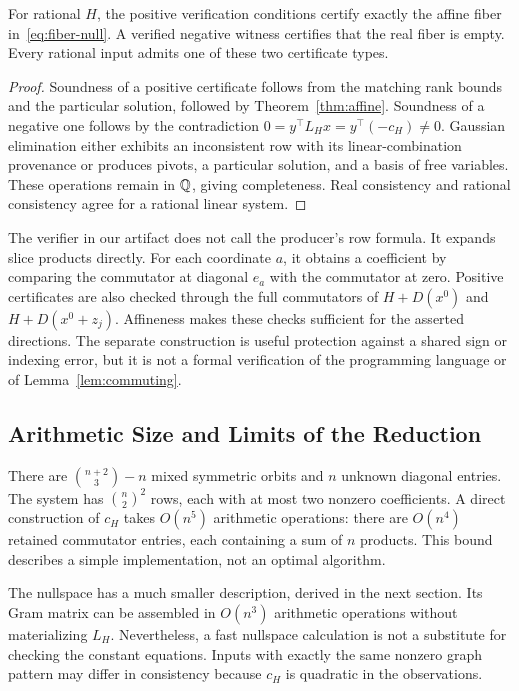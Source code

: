 \begin{proposition}\label{prop:certificates}
For rational $H$, the positive verification conditions certify exactly the affine fiber in~\eqref{eq:fiber-null}. A verified negative witness certifies that the real fiber is empty. Every rational input admits one of these two certificate types.
\end{proposition}
\begin{proof}
Soundness of a positive certificate follows from the matching rank bounds and the particular solution, followed by Theorem~\ref{thm:affine}. Soundness of a negative one follows by the contradiction $0=y^\top L_Hx=y^\top(-c_H)\ne0$. Gaussian elimination either exhibits an inconsistent row with its linear-combination provenance or produces pivots, a particular solution, and a basis of free variables. These operations remain in $\mathbb Q$, giving completeness. Real consistency and rational consistency agree for a rational linear system.
\end{proof}

The verifier in our artifact does not call the producer's row formula. It expands slice products directly. For each coordinate $a$, it obtains a coefficient by comparing the commutator at diagonal $e_a$ with the commutator at zero. Positive certificates are also checked through the full commutators of $H+D(x^0)$ and $H+D(x^0+z_j)$. Affineness makes these checks sufficient for the asserted directions. The separate construction is useful protection against a shared sign or indexing error, but it is not a formal verification of the programming language or of Lemma~\ref{lem:commuting}.

\subsection{Arithmetic Size and Limits of the Reduction}
There are $\binom{n+2}{3}-n$ mixed symmetric orbits and $n$ unknown diagonal entries. The system has $\binom n2^2$ rows, each with at most two nonzero coefficients. A direct construction of $c_H$ takes $O(n^5)$ arithmetic operations: there are $O(n^4)$ retained commutator entries, each containing a sum of $n$ products. This bound describes a simple implementation, not an optimal algorithm.

The nullspace has a much smaller description, derived in the next section. Its Gram matrix can be assembled in $O(n^3)$ arithmetic operations without materializing $L_H$. Nevertheless, a fast nullspace calculation is not a substitute for checking the constant equations. Inputs with exactly the same nonzero graph pattern may differ in consistency because $c_H$ is quadratic in the observations.

